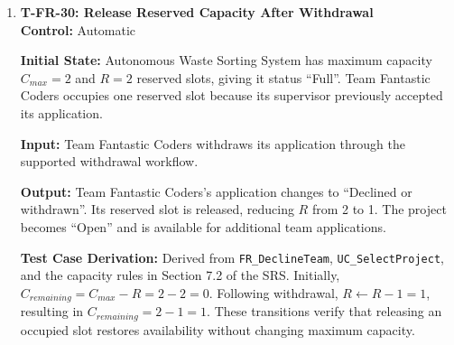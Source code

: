 \documentclass[12pt, titlepage]{article}
\begin{document}
\begin{enumerate}
\textbf{Control:} Automatic

\textbf{Initial State:} Team Fantastic Coders has submitted an application to an ``Open'' project. The application has status ``Applied'', and the supervisor has not accepted the team or reserved a slot.

\textbf{Input:} The supervisor declines Team Fantastic Coders's application and provides the optional reason: ``The project requires a different combination of technical skills.''

\textbf{Output:} The application changes to ``Declined or withdrawn''. The decision is communicated through a respectful message containing the supplied reason. No supervisor slot is reserved or released, and the project remains ``Open''.

\textbf{Test Case Derivation:} Derived from \texttt{FR\_DeclineTeam}. Declining an application before supervisor acceptance verifies that supervisors can reject applications, communicate the decision respectfully, and capacity remains unchanged.

\textbf{How Test Will Be Performed:} Using Playwright, authenticate as the supervisor, decline Team Fantastic Coders's application, and enter the specified reason. Verify the updated status, recorded reason, notification, and unchanged project capacity. Confirm that the message uses the system's respectful decline template.

\item \label{T-FR-30}\textbf{T-FR-30: Release Reserved Capacity After Withdrawal}\\

\textbf{Control:} Automatic

\textbf{Initial State:} Autonomous Waste Sorting System has maximum capacity $C_{max}=2$ and $R=2$ reserved slots, giving it status ``Full''. Team Fantastic Coders occupies one reserved slot because its supervisor previously accepted its application.

\textbf{Input:} Team Fantastic Coders withdraws its application through the supported withdrawal workflow.

\textbf{Output:} Team Fantastic Coders's application changes to ``Declined or withdrawn''. Its reserved slot is released, reducing $R$ from 2 to 1. The project becomes ``Open'' and is available for additional team applications.

\textbf{Test Case Derivation:} Derived from \texttt{FR\_DeclineTeam}, \texttt{UC\_SelectProject}, and the capacity rules in Section 7.2 of the SRS. Initially, $C_{remaining} = C_{max}-R = 2 - 2 = 0$. Following withdrawal, $R \leftarrow R - 1 = 1$, resulting in $C_{remaining} = 2 - 1 = 1$. These transitions verify that releasing an occupied slot restores availability without changing maximum capacity.


\end{enumerate}
\end{document}
